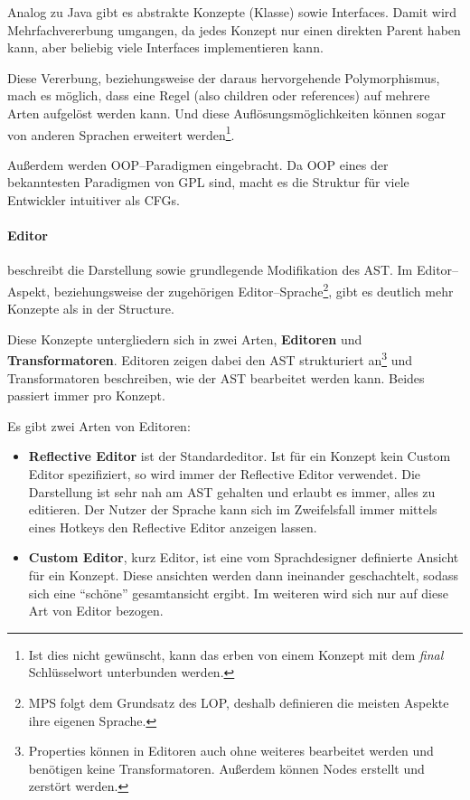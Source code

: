 Analog zu Java gibt es abstrakte Konzepte (Klasse) sowie Interfaces.
Damit wird Mehrfachvererbung umgangen, da jedes Konzept nur einen direkten Parent haben kann, aber beliebig viele Interfaces implementieren kann.

Diese Vererbung, beziehungsweise der daraus hervorgehende Polymorphismus, mach es möglich, dass eine Regel (also {\ttfamily children} oder {\ttfamily references}) auf mehrere Arten aufgelöst werden kann.
Und diese Auflösungsmöglichkeiten können sogar von anderen Sprachen erweitert werden\footnote{Ist dies nicht gewünscht, kann das erben von einem Konzept mit dem \textit{final} Schlüsselwort unterbunden werden.}.

Außerdem werden \acs{OOP}--Paradigmen eingebracht.
Da \ac{OOP} eines der bekanntesten Paradigmen von \ac{GPL} sind, macht es die Struktur für viele Entwickler intuitiver als \acp{CFG}.

\paragraph{Editor} beschreibt die Darstellung sowie grundlegende Modifikation des \ac{AST}.
Im Editor--Aspekt, beziehungsweise der zugehörigen Editor--Sprache\footnote{\ac{MPS} folgt dem Grundsatz des \ac{LOP}, deshalb definieren die meisten Aspekte ihre eigenen Sprache.}, gibt es deutlich mehr Konzepte als in der Structure.

Diese Konzepte untergliedern sich in zwei Arten, \textbf{Editoren} und \textbf{Transformatoren}.
Editoren zeigen dabei den \ac{AST} strukturiert an\footnote{Properties können in Editoren auch ohne weiteres bearbeitet werden und benötigen keine Transformatoren. Außerdem können Nodes erstellt und zerstört werden.} und Transformatoren beschreiben, wie der \ac{AST} bearbeitet werden kann.
Beides passiert immer pro Konzept.

Es gibt zwei Arten von Editoren:
\begin{itemize}
    \item \textbf{Reflective Editor} ist der Standardeditor.
    Ist für ein Konzept kein Custom Editor spezifiziert, so wird immer der Reflective Editor verwendet.
    Die Darstellung ist sehr nah am \ac{AST} gehalten und erlaubt es immer, alles zu editieren.
    Der Nutzer der Sprache kann sich im Zweifelsfall immer mittels eines Hotkeys den Reflective Editor anzeigen lassen.
    \item \textbf{Custom Editor}, kurz Editor, ist eine vom Sprachdesigner definierte Ansicht für ein Konzept.
    Diese ansichten werden dann ineinander geschachtelt, sodass sich eine \enquote{schöne} gesamtansicht ergibt.
    Im weiteren wird sich nur auf diese Art von Editor bezogen.
\end{itemize}

